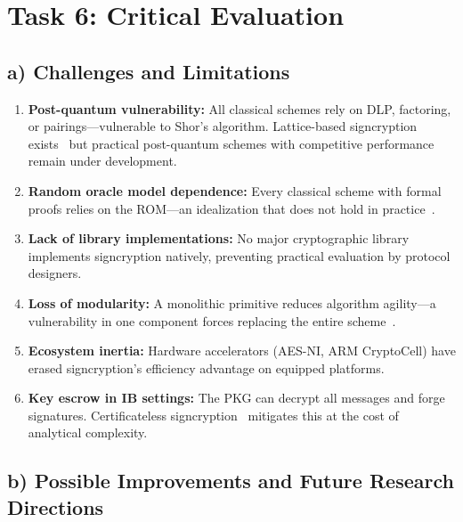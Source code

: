 \documentclass[11pt,a4paper]{article}
\begin{document}
\section{Task 6: Critical Evaluation}

\subsection{a) Challenges and Limitations}

\begin{enumerate}[label=\arabic*.]
    \item \textbf{Post-quantum vulnerability:} All classical schemes rely on DLP, factoring, or pairings---vulnerable to Shor's algorithm. Lattice-based signcryption exists~\cite{sato2018} but practical post-quantum schemes with competitive performance remain under development.
    \item \textbf{Random oracle model dependence:} Every classical scheme with formal proofs relies on the ROM---an idealization that does not hold in practice~\cite{sato2018}.
    \item \textbf{Lack of library implementations:} No major cryptographic library implements signcryption natively, preventing practical evaluation by protocol designers.
    \item \textbf{Loss of modularity:} A monolithic primitive reduces algorithm agility---a vulnerability in one component forces replacing the entire scheme~\cite{an2002}.
    \item \textbf{Ecosystem inertia:} Hardware accelerators (AES-NI, ARM CryptoCell) have erased signcryption's efficiency advantage on equipped platforms.
    \item \textbf{Key escrow in IB settings:} The PKG can decrypt all messages and forge signatures. Certificateless signcryption~\cite{barbosa2008} mitigates this at the cost of analytical complexity.
\end{enumerate}

\subsection{b) Possible Improvements and Future Research Directions}
\end{document}
